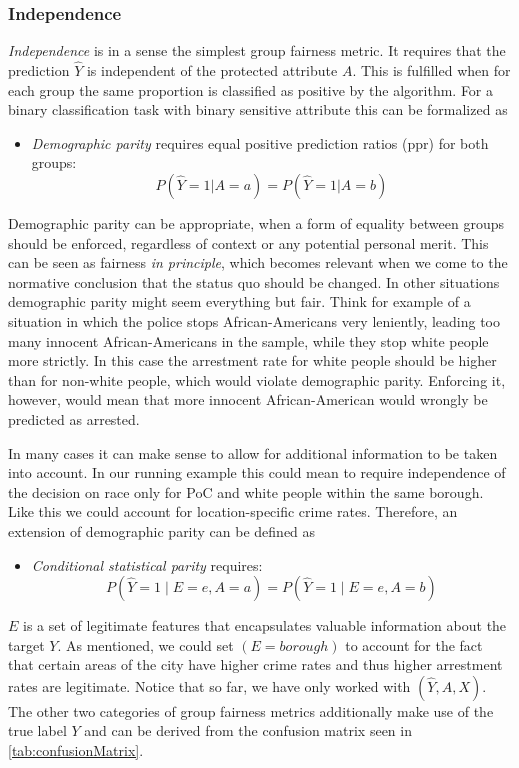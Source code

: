 \subsubsection*{Independence}
\textit{Independence} is in a sense the simplest group fairness metric. It requires that the prediction $\hat{Y}$ is independent of the protected attribute $A$. This is fulfilled when for each group the same proportion is classified as positive by the algorithm. For a binary classification task with binary sensitive attribute this can be formalized as
\begin{itemize}
    \item \textit{Demographic parity} requires equal positive prediction ratios (ppr) for both groups: $$P(\hat{Y} = 1 | A = a) = P(\hat{Y} = 1 | A = b)$$
\end{itemize}
Demographic parity can be appropriate, when a form of equality between groups should be enforced, regardless of context or any potential personal merit.
This can be seen as fairness \textit{in principle}, which becomes relevant when we come to the normative conclusion that the status quo should be changed. In other situations demographic parity might seem everything but fair. Think for example of a situation in which the police stops African-Americans very leniently, leading too many innocent African-Americans in the sample, while they stop white people more strictly. In this case the arrestment rate for white people should be higher than for non-white people, which would violate demographic parity. Enforcing it, however, would mean that more innocent African-American would wrongly be predicted as arrested.\par
In many cases it can make sense to allow for additional information to be taken into account. In our running example this could mean to require independence of the decision on race only for PoC and white people within the same borough. Like this we could account for location-specific crime rates. Therefore, an extension of demographic parity can be defined as
\begin{itemize}
    \item \textit{Conditional statistical parity} requires: $$P(\hat{Y} = 1 \mid E = e, A = a) = P(\hat{Y} = 1 \mid E = e, A = b)$$
\end{itemize}
$E$ is a set of legitimate features that encapsulates valuable information about the target $Y$. As mentioned, we could set $(E = borough)$ to account for the fact that certain areas of the city have higher crime rates and thus higher arrestment rates are legitimate.
Notice that so far, we have only worked with $(\hat{Y},A,X)$. The other two categories of group fairness metrics additionally make use of the true label $Y$ and can be derived from the confusion matrix seen in \autoref{tab:confusionMatrix}.


